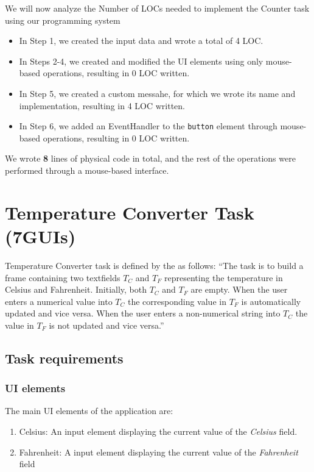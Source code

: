 We will now analyze the Number of LOCs needed to implement the Counter task using our programming system
\begin{itemize}
	\item In Step 1, we created the input data and wrote a total of 4 LOC.
	\item   In Steps 2-4, we created and modified the UI elements using only mouse-based operations, resulting in 0 LOC written.
	\item   In Step 5, we created a custom messahe, for which we wrote its name and implementation, resulting in 4 LOC written.
	\item   In Step 6, we added an EventHandler to the \texttt{button} element through mouse-based operations, resulting in 0 LOC written.
\end{itemize}
\noindent We wrote \textbf{8} lines of physical code in total, and the rest of the operations were performed through a mouse-based interface.







\clearpage
\section{Temperature Converter Task (7GUIs)}
Temperature Converter task is defined by the \citet{7GUIs-web} as follows: ``The task is to build a frame containing two textfields $T_C$ and $T_F$ representing the temperature in Celsius and Fahrenheit.
Initially, both $T_C$ and $T_F$ are empty.
When the user enters a numerical value into $T_C$ the corresponding value in $T_F$ is automatically updated and vice versa. When the user enters a non-numerical string into $T_C$ the value in $T_F$ is not updated and vice versa.''
\medskip
\subsection{Task requirements}
\subsubsection{UI elements}
The main UI elements of the application are:
\begin{enumerate}
	\item Celsius: An input element displaying the current value of the \emph{Celsius} field.
	\item Fahrenheit: A input element displaying the current value of the \emph{Fahrenheit} field
\end{enumerate}

